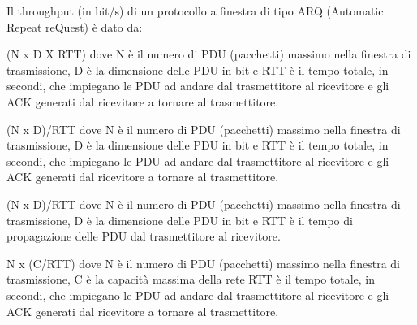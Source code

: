 \question[1]
Il throughput (in bit/s) di un protocollo a finestra di tipo ARQ (Automatic Repeat reQuest) è dato da:

\begin{checkboxes}
	\choice (N x D X RTT) dove N è il numero di PDU (pacchetti) massimo nella finestra di trasmissione, D è la dimensione delle PDU in bit e RTT è il tempo totale, in secondi, che impiegano le PDU ad andare dal trasmettitore al ricevitore e gli ACK generati dal ricevitore a tornare al trasmettitore.

	\CorrectChoice (N x D)/RTT dove N è il numero di PDU (pacchetti) massimo nella finestra di trasmissione, D è la dimensione delle PDU in bit e RTT è il tempo totale, in secondi, che impiegano le PDU ad andare dal trasmettitore al ricevitore e gli ACK generati dal ricevitore a tornare al trasmettitore.

	\choice (N x D)/RTT dove N è il numero di PDU (pacchetti) massimo nella finestra di trasmissione, D è la dimensione delle PDU in bit e RTT è il tempo di propagazione delle PDU dal trasmettitore al ricevitore.

	\choice N x (C/RTT) dove N è il numero di PDU (pacchetti) massimo nella finestra di trasmissione, C è la capacità massima della rete RTT è il tempo totale, in secondi, che impiegano le PDU ad andare dal trasmettitore al ricevitore e gli ACK generati dal ricevitore a tornare al trasmettitore.
\end{checkboxes}
